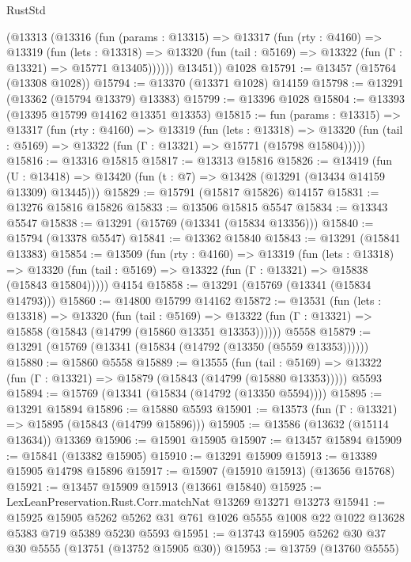 \begin{lexlean}{RustStd}
\begin{coremodule}
      (@13313
        (@13316
          (fun (params : @13315) =>
          @13317
            (fun (rty : @4160) =>
            @13319
              (fun (lets : @13318) =>
              @13320 (fun (tail : @5169) => @13322 (fun (Γ : @13321) => @15771 @13405))))))
        @13451))
    @1028
@15791 := @13457 (@15764 (@13308 @1028))
@15794 := @13370 (@13371 @1028) @14159
@15798 := @13291 (@13362 (@15794 @13379) @13383)
@15799 := @13396 @1028
@15804 := @13393 (@13395 @15799 @14162 @13351 @13353)
@15815 := fun (params : @13315) =>
  @13317
    (fun (rty : @4160) =>
    @13319
      (fun (lets : @13318) =>
      @13320 (fun (tail : @5169) => @13322 (fun (Γ : @13321) => @15771 (@15798 @15804)))))
@15816 := @13316 @15815
@15817 := @13313 @15816
@15826 := @13419
    (fun (U : @13418) => @13420 (fun (t : @7) => @13428 (@13291 (@13434 @14159 @13309) @13445)))
@15829 := @15791 (@15817 @15826) @14157
@15831 := @13276 @15816 @15826
@15833 := @13506 @15815 @5547
@15834 := @13343 @5547
@15838 := @13291 (@15769 (@13341 (@15834 @13356)))
@15840 := @15794 (@13378 @5547)
@15841 := @13362 @15840
@15843 := @13291 (@15841 @13383)
@15854 := @13509
    (fun (rty : @4160) =>
    @13319
      (fun (lets : @13318) =>
      @13320 (fun (tail : @5169) => @13322 (fun (Γ : @13321) => @15838 (@15843 @15804)))))
    @4154
@15858 := @13291 (@15769 (@13341 (@15834 @14793)))
@15860 := @14800 @15799 @14162
@15872 := @13531
    (fun (lets : @13318) =>
    @13320
      (fun (tail : @5169) =>
      @13322 (fun (Γ : @13321) => @15858 (@15843 (@14799 (@15860 @13351 @13353))))))
    @5558
@15879 := @13291 (@15769 (@13341 (@15834 (@14792 (@13350 (@5559 @13353))))))
@15880 := @15860 @5558
@15889 := @13555
    (fun (tail : @5169) => @13322 (fun (Γ : @13321) => @15879 (@15843 (@14799 (@15880 @13353)))))
    @5593
@15894 := @15769 (@13341 (@15834 (@14792 (@13350 @5594))))
@15895 := @13291 @15894
@15896 := @15880 @5593
@15901 := @13573 (fun (Γ : @13321) => @15895 (@15843 (@14799 @15896)))
@15905 := @13586 (@13632 (@15114 @13634)) @13369
@15906 := @15901 @15905
@15907 := @13457 @15894
@15909 := @15841 (@13382 @15905)
@15910 := @13291 @15909
@15913 := @13389 @15905 @14798 @15896
@15917 := @15907 (@15910 @15913) (@13656 @15768)
@15921 := @13457 @15909 @15913 (@13661 @15840)
@15925 := LexLeanPreservation.Rust.Corr.matchNat @13269 @13271 @13273
@15941 := @15925
    @15905
    @5262
    @5262
    @31
    @761
    @1026
    @5555
    @1008
    @22
    @1022
    @13628
    @5383
    @719
    @5389
    @5230
    @5593
@15951 := @13743 @15905 @5262 @30 @37 @30 @5555 (@13751 (@13752 @15905 @30))
@15953 := @13759 (@13760 @5555)

\end{coremodule}
\end{lexlean}
